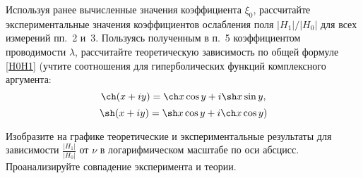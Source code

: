 \begin{lab:task}
\item Используя ранее вычисленные значения коэффициента $\xi_0$,
рассчитайте экспериментальные значения коэффициентов
ослабления поля $|H_1|/|H_0|$ для всех измерений пп.~2 и~3.
Пользуясь полученным в п.~5 коэффициентом проводимости $\lambda$,
рассчитайте теоретическую зависимость по общей формуле \eqref{H0H1}
(учтите соотношения для гиперболических функций комплексного аргумента:
\[\ch(x+iy) = \ch x \cos y + i \sh x \sin y,
\]
\[\sh(x+iy) = \sh x \cos y + i \ch x \cos y)
\]

Изобразите на графике теоретические и экспериментальные
результаты для зависимости $\frac{|H_1|}{|H_0|}$ от $\nu$
в логарифмическом масштабе по оси абсцисс.
Проанализируйте совпадение эксперимента и теории.


\end{lab:task}



